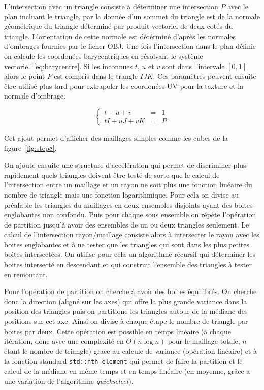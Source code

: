 \documentclass[12pt]{article}
\newcommand\id[1]{\texttt{#1}}
\begin{document}
L'intersection avec un triangle consiste à déterminer une intersection $P$ avec le plan incluant le triangle, par la donnée d'un sommet du triangle est de la normale géométrique du triangle déterminé par produit vectoriel de deux cotés du triangle.
L'orientation de cette normale est détérminé d'après les normales d'ombrages fournies par le ficher OBJ\@.
Une fois l'intersection dans le plan définie on calcule les coordonées barycentriques en résolvant le système vectoriel~\ref{eq:barycentre}.
Si les inconnues $t$, $u$ et $v$ sont dans l'intervale $[0, 1]$ alors le point $P$ est compris dans le trangle $IJK$.
Ces paramètres peuvent ensuite être utilisé plus tard pour extrapoler les coordonées UV pour la texture et la normale d'ombrage.

\begin{equation}
  \left\{
    \begin{array}{lcr}
      t + u + v & = & 1\\
      t I + u J + v K & = & P
      \label{eq:barycentre}
    \end{array}
  \right.
\end{equation}

Cet ajout permet d'afficher des maillages simples comme les cubes de la figure~\ref{fig:step8}.

On ajoute ensuite une structure d'accélération qui permet de discriminer plus rapidement quels triangles doivent être testé de sorte que le calcul de l'intersection entre un maillage et un rayon ne soit plus une fonction linéaire du nombre de triangle mais une fonction logarithmique.
Pour cela on divise au préalable les triangles du maillages en deux ensembles disjoints ayant des boites englobantes non confondu.
Puis pour chaque sous ensemble on répète l'opération de partition jusqu'à avoir des ensembles de un ou deux triangles seulement.
Le calcul de l'intersection rayon/maillage consiste alors à intersecter le rayon avec les boites englobantes et à ne tester que les triangles qui sont dans les plus petites boites intersectées.
On utilise pour cela un algorithme récursif qui déterminer les boites intersecté en descendant et qui construit l'ensemble des triangles à tester en remontant.

Pour l'opération de partition on cherche à avoir des boites équilibrés.
On cherche donc la direction (aligné sur les axes) qui offre la plus grande variance dans la position des triangles puis on partitione les triangles autour de la médiane des positions sur cet axe.
Ainsi on divise à chaque étape le nombre de triangle par boites par deux.
Cette opération est possible en temps linéaire (à chaque itération, donc avec une complexité en $O(n \log{n})$ pour le maillage totale, $n$ étant le nombre de triangle) grace au calcule de variance (opération linéaire) et à la fonction standard \id{std::nth\_element} qui permet de faire la partition et le calcul de la médiane en même temps et en temps linéaire (en moyenne, grâce a une variation de l'algorithme \textit{quickselect}).
\end{document}
